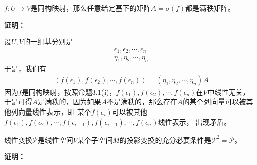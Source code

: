 \documentclass{article}
\begin{document}
\begin{zremark}
  $f: U \to V$是同构映射，那么任意给定基下的矩阵$A = \sigma(f)$都是满秩矩阵。
\end{zremark}

\textbf{证明：}

设$U, V$的一组基分别是
\begin{align*}
  \epsilon_1, \epsilon_2, \cdots, \epsilon_n \\
  \eta_1, \eta_2, \cdots, \eta_n
\end{align*}
于是，我们有
\begin{align*}
  (f(\epsilon_1), f(\epsilon_2), \cdots, f(\epsilon_n)) = (\eta_1, \eta_2, \cdots, \eta_n) A
\end{align*}
因为$f$是同构映射，按照命题3.1(i)，$f(\epsilon_1), f(\epsilon_2), \cdots, f(\epsilon_n)$在$V$中线性无关，
于是可得$A$是满秩的，因为如果$A$不是满秩的，那么存在$A$的某个列向量可以被其他列向量线性表示，即
某个$f(\epsilon_i)$可以被其他
$f(\epsilon_1), f(\epsilon_2), \cdots, f(\epsilon_{i-1}), f(\epsilon_{i+1}), \cdots, f(\epsilon_n)$线性表示，
出现矛盾。

\begin{zremark}
  线性变换$\mathscr{P}$是线性空间$V$某个子空间$M$的投影变换的充分必要条件是$\mathscr{P}^2 = \mathscr{P}$。
\end{zremark}

\textbf{证明：}
\end{document}

